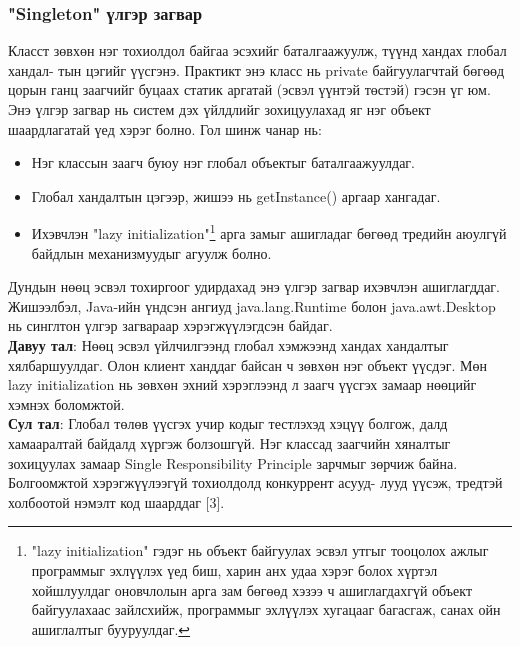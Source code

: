 \subsubsection{"Singleton" үлгэр загвар}
\quad \quad Класст зөвхөн нэг тохиолдол байгаа эсэхийг баталгаажуулж, түүнд хандах глобал хандал- тын цэгийг үүсгэнэ.
Практикт энэ класс нь private байгуулагчтай бөгөөд цорын ганц заагчийг буцаах статик аргатай (эсвэл үүнтэй төстэй) гэсэн үг юм. Энэ үлгэр загвар нь систем дэх үйлдлийг зохицуулахад яг нэг объект шаардлагатай үед хэрэг болно. Гол шинж чанар нь:
\begin{itemize}
	\item Нэг классын заагч буюу нэг глобал объектыг баталгаажуулдаг.
	\item Глобал хандалтын цэгээр, жишээ нь getInstance() аргаар хангадаг.
	\item Ихэвчлэн "lazy initialization"\footnote{"lazy initialization" гэдэг нь объект байгуулах эсвэл утгыг тооцолох ажлыг программыг эхлүүлэх үед биш, харин анх удаа хэрэг болох хүртэл хойшлуулдаг оновчлолын арга зам бөгөөд хэзээ ч ашиглагдахгүй объект байгуулахаас зайлсхийж, программыг эхлүүлэх хугацааг багасгаж, санах ойн ашиглалтыг бууруулдаг.} арга замыг ашигладаг бөгөөд тредийн аюулгүй байдлын механизмуудыг агуулж болно.
\end{itemize}
Дундын нөөц эсвэл тохиргоог удирдахад энэ үлгэр загвар ихэвчлэн ашиглагддаг. Жишээлбэл, Java-ийн үндсэн ангиуд java.lang.Runtime болон java.awt.Desktop нь синглтон үлгэр загвараар хэрэгжүүлэгдсэн байдаг. \\
\textbf{Давуу тал}: Нөөц эсвэл үйлчилгээнд глобал хэмжээнд хандах хандалтыг хялбаршуулдаг. Олон клиент ханддаг байсан ч зөвхөн нэг объект үүсдэг. Мөн lazy initialization нь зөвхөн эхний хэрэглээнд л заагч үүсгэх замаар нөөцийг хэмнэх боломжтой. \\
\textbf{Сул тал}: Глобал төлөв үүсгэх учир кодыг тестлэхэд хэцүү болгож, далд хамааралтай байдалд хүргэж болзошгүй. Нэг классад заагчийн хяналтыг зохицуулах замаар Single Responsibility Principle зарчмыг зөрчиж байна. Болгоомжтой хэрэгжүүлээгүй тохиолдолд конкуррент асууд- лууд үүсэж, тредтэй холбоотой нэмэлт код шаарддаг [3].

